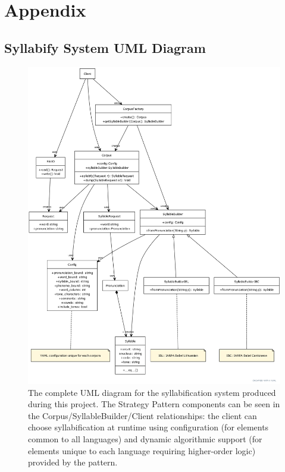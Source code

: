\documentclass[11pt]{article}
\begin{document}
\newpage
\section{Appendix}
\subsection{Syllabify System UML Diagram}
\begin{figure}[h]
  \centering
  \includegraphics[scale=0.3]{UMLdiag.png}
  \caption{The complete UML diagram for the syllabification system produced during this project. The Strategy Pattern components can be seen in the Corpus/SyllableBuilder/Client relationships: the client can choose syllabification at runtime using configuration (for elements common to all languages) and dynamic algorithmic support (for elements unique to each language requiring higher-order logic) provided by the pattern.}
  \label{fig:UMLdiag}
\end{figure}

\newpage

\vskip 0.2in

\end{document}
